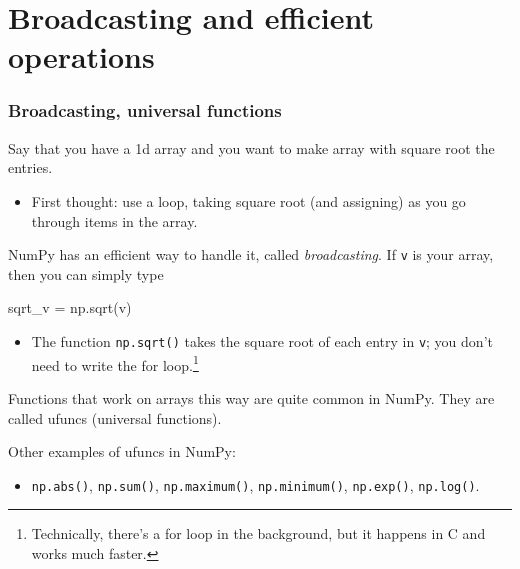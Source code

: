 \documentclass{beamer}
\newenvironment{codeblock}
    {\hfill\begin{beamerboxesrounded}[lower=codecol, width=0.8\textwidth]
    \medskip

    }
    { 
    \end{beamerboxesrounded}\hfill
    }
\theoremstyle{example}
\newcommand{\ttt}[1]{{\small\texttt{#1}}}
\begin{document}
\section{Broadcasting and efficient operations}
\begin{frame}[fragile]
\frametitle{Broadcasting, universal functions}
Say that you have a 1d array and you want to make array with square root the entries. 
\begin{itemize}
    \item[] First thought: use a loop, taking square root (and assigning) as you go through items in the array.
\end{itemize}

NumPy has an efficient way to handle it, called \emph{broadcasting}. If \ttt{v} is your array, then you can simply type 

\begin{codeblock}

\begin{python}[numbers=none]
sqrt_v = np.sqrt(v)
\end{python}

\end{codeblock}

\begin{itemize}
    \item[] The function \ttt{np.sqrt()} takes the square root of each entry in \ttt{v}; you don't need to write the for loop.\footnote{Technically, there's a for loop in the background, but it happens in C and works much faster.}
\end{itemize}
Functions that work on arrays this way are quite common in NumPy. They are called {\ttb ufuncs} (universal functions).

\pause
Other examples of ufuncs in NumPy: 
    \begin{itemize}
        \item[] \ttt{np.abs()}, \ttt{np.sum()}, \ttt{np.maximum()}, \ttt{np.minimum()}, \ttt{np.exp()}, \ttt{np.log()}.
    \end{itemize}
\end{frame}
\end{document}
